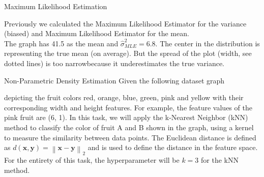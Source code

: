 \documentclass[
	english,
        solution=true
	]{tudaexercise}
\begin{document}
\begin{task}[points=20]{Maximum Likelihood Estimation}
\begin{subtask}[points=5]
\begin{solution}
Previously we calculated the Maximum Likelihood Estimator for the variance (biased) and Maximum Likelihood Estimator for the mean. \\
The graph has 41.5 as the mean and $\hat{\sigma}^2_{MLE}=6.8$. The center in the distribution is representing the true mean (on average). But the spread of the plot (width, see dotted lines) is too narrowbecause it underestimates the true variance.

\end{solution}
\end{subtask}
\end{task}

\newpage

\begin{task}[points=9]{Non-Parametric Density Estimation}
Given the following dataset graph

\begin{center}
\end{center}

depicting the fruit colors red, orange, blue, green, pink and yellow with their corresponding width and height features. For example, the feature values of the pink fruit are (6, 1). In this task, we will apply the k-Nearest Neighbor (kNN) method to classify the color of fruit A and B shown in the graph, using a kernel to measure the similarity between data points. The Euclidean distance is defined as $d(\boldsymbol{x}, \boldsymbol{y}) = \left\| \boldsymbol{x} - \boldsymbol{y}\right\|_2$ and is used to define the distance in the feature space. For the entirety of this task, the hyperparameter will be $k = 3$ for the kNN method. 



\end{task}
\end{document}
